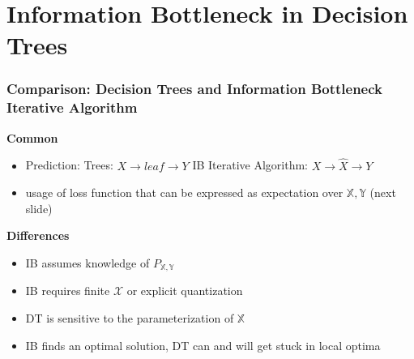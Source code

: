 \section[IB in Trees]{Information Bottleneck in Decision Trees} %
\begin{frame}
    \frametitle{Comparison: Decision Trees and Information Bottleneck Iterative Algorithm}
    
    \textbf{Common}
    \begin{itemize}
        \item Prediction: \newline
        Trees: $X \rightarrow leaf \rightarrow Y$ \newline
        IB Iterative Algorithm: $X \rightarrow \hat{X} \rightarrow Y$
        \item usage of loss function that can be expressed as expectation over $\mathbb{X}, \mathbb{Y}$ (next slide)
    \end{itemize}
    \textbf{Differences}
    \begin{itemize}
        \item IB assumes knowledge of $P_{\mathbb{X}, \mathbb{Y}}$
        \item IB requires finite $\mathcal{X}$ or explicit quantization
        \item DT is sensitive to the parameterization of $\mathbb{X}$
        \item IB finds an optimal solution, DT can and will get stuck in local optima
    \end{itemize}
\end{frame}


